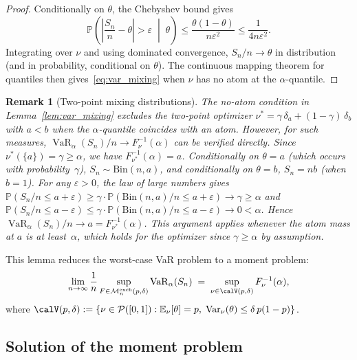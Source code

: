 \documentclass[11pt]{article}
\newtheorem{remark}[theorem]{Remark}
\theoremstyle{definition}
\newcommand{\E}{\mathbb{E}}
\newcommand{\Var}{\operatorname{Var}}
\newcommand{\VaR}{\operatorname{VaR}}
\newcommand{\PP}{\mathbb{P}}
\newcommand{\1}{\mathbf{1}}
\newcommand{\calM}{\mathcal{M}}
\newcommand{\calP}{\mathcal{P}}
\begin{document}
\begin{proof}
Conditionally on $\theta$, the Chebyshev bound gives
\[
  \PP\!\left(\left|\frac{S_n}{n} - \theta\right| > \varepsilon \;\middle|\; \theta\right) \leq \frac{\theta(1-\theta)}{n\varepsilon^2} \leq \frac{1}{4n\varepsilon^2}.
\]
Integrating over $\nu$ and using dominated convergence, $S_n/n \to \theta$ in distribution (and in probability, conditional on $\theta$). The continuous mapping theorem for quantiles \citep[Lemma~21.2]{vanderVaart1998} then gives~\eqref{eq:var_mixing} when $\nu$ has no atom at the $\alpha$-quantile.
\end{proof}

\begin{remark}[Two-point mixing distributions]\label{rem:twopoint_atom}
The no-atom condition in Lemma~\ref{lem:var_mixing} excludes the two-point optimizer $\nu^* = \gamma\,\delta_a + (1-\gamma)\,\delta_b$ with $a < b$ when the $\alpha$-quantile coincides with an atom. However, for such measures, $\VaR_\alpha(S_n)/n \to F_\nu^{-1}(\alpha)$ can be verified directly. Since $\nu^*(\{a\}) = \gamma \geq \alpha$, we have $F_{\nu^*}^{-1}(\alpha) = a$. Conditionally on $\theta = a$ (which occurs with probability~$\gamma$), $S_n \sim \mathrm{Bin}(n, a)$, and conditionally on $\theta = b$, $S_n = nb$ (when $b = 1$). For any $\varepsilon > 0$, the law of large numbers gives $\PP(S_n/n \leq a + \varepsilon) \geq \gamma \cdot \PP(\mathrm{Bin}(n,a)/n \leq a + \varepsilon) \to \gamma \geq \alpha$ and $\PP(S_n/n \leq a - \varepsilon) \leq \gamma \cdot \PP(\mathrm{Bin}(n,a)/n \leq a - \varepsilon) \to 0 < \alpha$. Hence $\VaR_\alpha(S_n)/n \to a = F_{\nu^*}^{-1}(\alpha)$. This argument applies whenever the atom mass at $a$ is at least~$\alpha$, which holds for the optimizer since $\gamma \geq \alpha$ by assumption.
\end{remark}

This lemma reduces the worst-case VaR problem to a moment problem:
\begin{equation}\label{eq:moment_problem}
  \lim_{n \to \infty} \frac{1}{n} \sup_{F \in \calM_n^{\mathrm{exch}}(p,\delta)} \VaR_\alpha(S_n)
  \;=\; \sup_{\nu \in \calV(p,\delta)} F_\nu^{-1}(\alpha),
\end{equation}
where $\calV(p,\delta) := \{\nu \in \calP([0,1]) : \E_\nu[\theta] = p,\; \Var_\nu(\theta) \leq \delta\,p(1-p)\}$.

\subsection{Solution of the moment problem}
\end{document}

